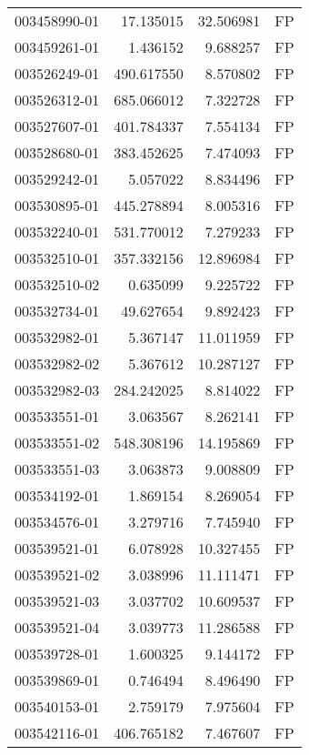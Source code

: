 \begin{tabular}{lrrl}
003458990-01 &   17.135015 &      32.506981 &   FP \\
003459261-01 &    1.436152 &       9.688257 &   FP \\
003526249-01 &  490.617550 &       8.570802 &   FP \\
003526312-01 &  685.066012 &       7.322728 &   FP \\
003527607-01 &  401.784337 &       7.554134 &   FP \\
003528680-01 &  383.452625 &       7.474093 &   FP \\
003529242-01 &    5.057022 &       8.834496 &   FP \\
003530895-01 &  445.278894 &       8.005316 &   FP \\
003532240-01 &  531.770012 &       7.279233 &   FP \\
003532510-01 &  357.332156 &      12.896984 &   FP \\
003532510-02 &    0.635099 &       9.225722 &   FP \\
003532734-01 &   49.627654 &       9.892423 &   FP \\
003532982-01 &    5.367147 &      11.011959 &   FP \\
003532982-02 &    5.367612 &      10.287127 &   FP \\
003532982-03 &  284.242025 &       8.814022 &   FP \\
003533551-01 &    3.063567 &       8.262141 &   FP \\
003533551-02 &  548.308196 &      14.195869 &   FP \\
003533551-03 &    3.063873 &       9.008809 &   FP \\
003534192-01 &    1.869154 &       8.269054 &   FP \\
003534576-01 &    3.279716 &       7.745940 &   FP \\
003539521-01 &    6.078928 &      10.327455 &   FP \\
003539521-02 &    3.038996 &      11.111471 &   FP \\
003539521-03 &    3.037702 &      10.609537 &   FP \\
003539521-04 &    3.039773 &      11.286588 &   FP \\
003539728-01 &    1.600325 &       9.144172 &   FP \\
003539869-01 &    0.746494 &       8.496490 &   FP \\
003540153-01 &    2.759179 &       7.975604 &   FP \\
003542116-01 &  406.765182 &       7.467607 &   FP \\

\end{tabular}
